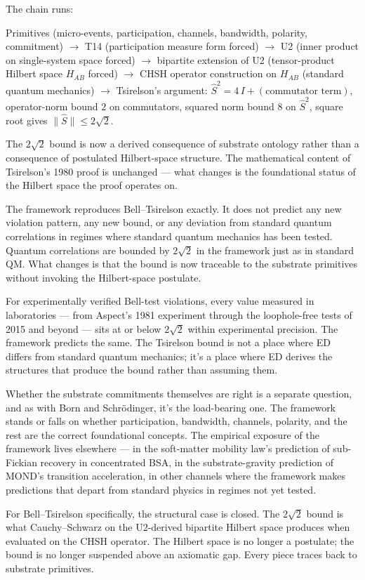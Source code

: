 \documentclass[11pt,a4paper]{article}
\begin{document}
The chain runs:

Primitives (micro-events, participation, channels, bandwidth, polarity, commitment) $\to$ T14 (participation measure form forced) $\to$ U2 (inner product on single-system space forced) $\to$ bipartite extension of U2 (tensor-product Hilbert space $H_{AB}$ forced) $\to$ CHSH operator construction on $H_{AB}$ (standard quantum mechanics) $\to$ Tsirelson's argument: $\hat{S}^2 = 4\, I + (\text{commutator term})$, operator-norm bound $2$ on commutators, squared norm bound $8$ on $\hat{S}^2$, square root gives $\|\hat{S}\| \leq 2\sqrt{2}$.

The $2\sqrt{2}$ bound is now a derived consequence of substrate ontology rather than a consequence of postulated Hilbert-space structure. The mathematical content of Tsirelson's 1980 proof is unchanged --- what changes is the foundational status of the Hilbert space the proof operates on.

The framework reproduces Bell--Tsirelson exactly. It does not predict any new violation pattern, any new bound, or any deviation from standard quantum correlations in regimes where standard quantum mechanics has been tested. Quantum correlations are bounded by $2\sqrt{2}$ in the framework just as in standard QM. What changes is that the bound is now traceable to the substrate primitives without invoking the Hilbert-space postulate.

For experimentally verified Bell-test violations, every value measured in laboratories --- from Aspect's 1981 experiment through the loophole-free tests of 2015 and beyond --- sits at or below $2\sqrt{2}$ within experimental precision. The framework predicts the same. The Tsirelson bound is not a place where ED differs from standard quantum mechanics; it's a place where ED derives the structures that produce the bound rather than assuming them.

Whether the substrate commitments themselves are right is a separate question, and as with Born and Schr\"odinger, it's the load-bearing one. The framework stands or falls on whether participation, bandwidth, channels, polarity, and the rest are the correct foundational concepts. The empirical exposure of the framework lives elsewhere --- in the soft-matter mobility law's prediction of sub-Fickian recovery in concentrated BSA, in the substrate-gravity prediction of MOND's transition acceleration, in other channels where the framework makes predictions that depart from standard physics in regimes not yet tested.

For Bell--Tsirelson specifically, the structural case is closed. The $2\sqrt{2}$ bound is what Cauchy--Schwarz on the U2-derived bipartite Hilbert space produces when evaluated on the CHSH operator. The Hilbert space is no longer a postulate; the bound is no longer suspended above an axiomatic gap. Every piece traces back to substrate primitives.
\end{document}
